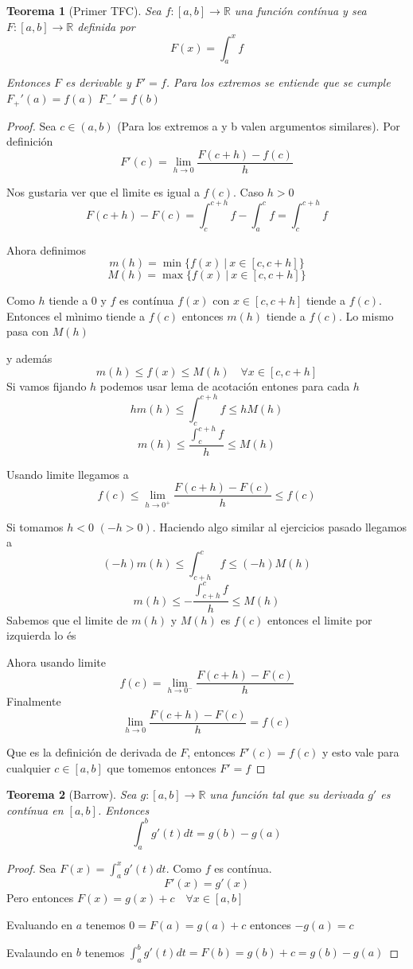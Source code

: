 \documentclass{article}
\theoremstyle{break}
\newtheorem{theorem}{Teorema}[section]
\begin{document}
\begin{theorem}[Primer TFC]
	Sea $f:[a,b] \rightarrow \mathbb{R}$ una función contínua y sea $F:[a,b] \rightarrow \mathbb{R}$
	definida por \[ F(x) = \int_{a}^{x} f \]

	Entonces $F$ es derivable y $F'=f$. Para los extremos se entiende que se cumple $F_+'(a)=f(a)$
	$F_{-}'=f(b)$
\end{theorem}
\begin{proof}
	Sea $c \in (a,b)$ (Para los extremos a y b valen argumentos similares). Por definición
	\[ F'(c) = \lim_{h \rightarrow 0 }\frac{F(c+h)-f(c)}{h} \]

	Nos gustaria ver que el lìmite es igual a $f(c)$.
	Caso $h>0$
	\[ F(c+h) - F(c) = \int_{c}^{c+h} f - \int_{a}^{c} f = \int_{c}^{c+h} f \]

	Ahora definimos \[ m(h)=\min\{f(x) \ | \ x\in [c,c+h]\} \]
	\[ M(h)=\max\{f(x) \ | \ x\in [c,c+h]\} \]

	Como $h$ tiende a 0 y $f$ es contínua $f(x)$ con $x\in [c,c+h]$ tiende a $f(c)$. Entonces
	el mìnimo tiende a $f(c)$ entonces $m(h)$ tiende a $f(c)$. Lo mismo pasa con $M(h)$

	y además \[ m(h) \leq f(x) \leq M(h) \quad \forall x \in [c,c+h]\]
	Si vamos fijando $h$ podemos usar lema de acotación entones para cada $h$
	\[ hm(h)\leq \int_{c}^{c+h} f \leq hM(h) \]
	\[ m(h) \leq \frac{\int_{c}^{c+h} f}{h} \leq M(h) \]

	Usando limite llegamos a \[ f(c) \leq \lim_{h \rightarrow 0^+ } 
	\frac{ F(c+h)-F(c)}{h} \leq f(c) \]
		
	Si tomamos $h<0$ $(-h>0)$. Haciendo algo similar al ejercicios pasado llegamos a
	\[ (-h)m(h) \leq \int_{c+h}^{c} f \leq (-h)M(h) \]
	\[ m(h) \leq -\frac{\int_{c+h}^{c}f}{h} \leq M(h) \]
	Sabemos que el limite de $m(h)$ y $M(h)$ es $f(c)$ entonces el limite por izquierda lo és

	Ahora usando limite \[ f(c) = \lim_{h \rightarrow 0^-} \frac{ F(c+h)-F(c)}{h}  \]
	Finalmente \[ \lim_{h \rightarrow 0 } \frac{F(c+h) -F(c)}{h} = f(c) \]

	Que es la definición de derivada de $F$, entonces $F'(c)=f(c)$ y esto vale para
	cualquier $c\in[a,b]$ que tomemos entonces $F'=f$
\end{proof}

\begin{theorem}[Barrow]
	Sea $g:[a,b]\rightarrow \mathbb{R}$ una función tal que su derivada $g'$ es contínua en $[a,b]$.
	Entonces \[ \int_{a}^{b} g'(t) dt = g(b) - g(a) \]
\end{theorem}
\begin{proof}
	Sea $F(x) = \int_{a}^{x} g'(t) dt$. Como $f$ es contínua.
	\[ F'(x) = g'(x) \]
	Pero entonces $F(x) = g(x) + c\quad \forall x\in [a,b]$

	Evaluando en $a$ tenemos $0 =F(a) = g(a) + c $ entonces $-g(a) = c$

	Evalaundo en $b$ tenemos $\int_{a}^{b} g'(t)dt = F(b) = g(b) + c = g(b) - g(a)$
\end{proof}
\end{document}
